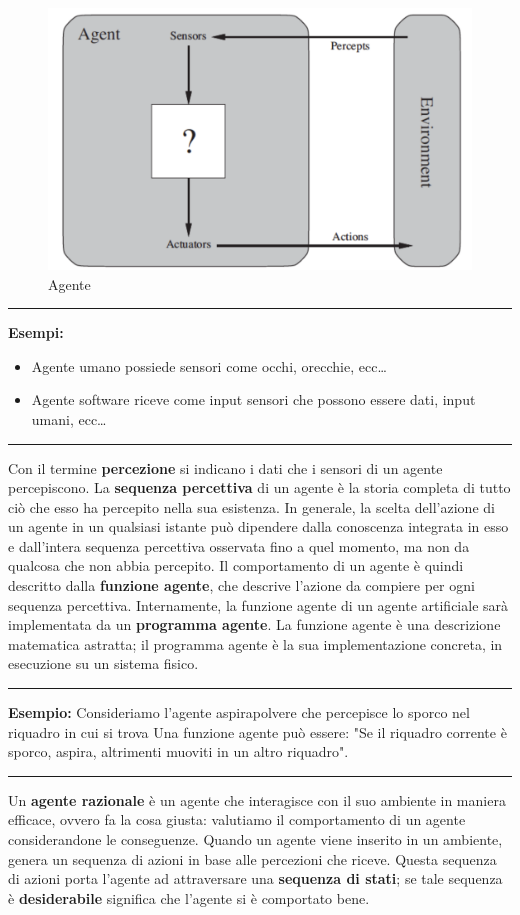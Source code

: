 \documentclass{article}
\begin{document}
\begin{figure}[H]
    \centering
    \includegraphics[width=0.5\linewidth]{Images/agenteBase.png}
    \caption{Agente}
    \label{fig:enter-label}
\end{figure}
\par\noindent\rule{\textwidth}{0.4pt}
\noindent\textbf{Esempi:}
\begin{itemize}
    \item Agente umano possiede sensori come occhi, orecchie, ecc…
    \item Agente software riceve come input sensori che possono essere dati, input umani, ecc…
\end{itemize}
\par\noindent\rule{\textwidth}{0.4pt}
\noindent Con il termine \textbf{percezione} si indicano i dati che i sensori di un agente percepiscono. La \textbf{sequenza percettiva} di un agente è la storia completa di tutto ciò che esso ha percepito nella sua esistenza.
In generale, la scelta dell'azione di un agente in un qualsiasi istante può dipendere dalla conoscenza integrata in esso e dall'intera sequenza percettiva osservata fino a quel momento, ma non da qualcosa che non abbia percepito.
Il comportamento di un agente è quindi descritto dalla \textbf{funzione agente}, che descrive l'azione da compiere per ogni sequenza percettiva.
Internamente, la funzione agente di un agente artificiale sarà implementata da un \textbf{programma agente}.  La funzione agente è una descrizione matematica astratta; il programma agente è la sua implementazione concreta, in esecuzione su un sistema fisico.
\par\noindent\rule{\textwidth}{0.4pt}
\noindent\textbf{Esempio: }Consideriamo l'agente aspirapolvere che percepisce lo sporco nel riquadro in cui si trova Una funzione agente può essere: "Se il riquadro corrente è sporco, aspira, altrimenti muoviti in un altro riquadro".
\par\noindent\rule{\textwidth}{0.4pt}
\noindent Un \textbf{agente razionale} è un agente che interagisce con il suo ambiente in maniera efficace, ovvero fa la cosa giusta: valutiamo il comportamento di un agente considerandone le conseguenze. Quando un agente viene inserito in un ambiente, genera un sequenza di azioni in base alle percezioni che riceve. Questa sequenza di azioni porta l'agente ad attraversare una \textbf{sequenza di stati}; se tale sequenza è \textbf{desiderabile} significa che l'agente si è comportato bene.\newline
\end{document}
